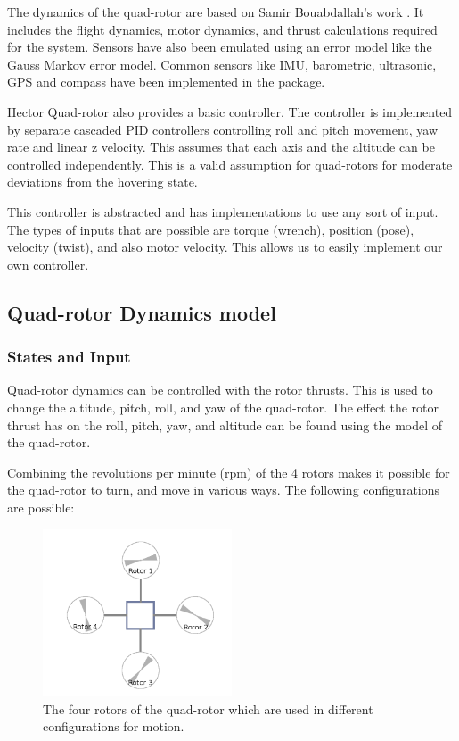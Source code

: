 \documentclass[hidelinks,BTech]{iitmdiss}
\begin{document}
The dynamics of the quad-rotor are based on Samir Bouabdallah's work \cite{QuadrotorDynamics}. It includes the flight dynamics, motor dynamics, and thrust calculations required for the system. Sensors have also been emulated using an error model like the Gauss Markov error model. Common sensors like IMU, barometric, ultrasonic, GPS and compass have been implemented in the package.

Hector Quad-rotor also provides a basic controller. The controller is implemented by separate cascaded PID controllers controlling roll and pitch movement, yaw rate and linear z velocity. This assumes that each axis and the altitude can be controlled independently. This is a valid assumption for quad-rotors for moderate deviations from the hovering state.

This controller is abstracted and has implementations to use any sort of input. The types of inputs that are possible are torque (wrench), position (pose), velocity (twist), and also motor velocity. This allows us to easily implement our own controller.

\subsection{Quad-rotor Dynamics model}

\subsubsection{States and Input}
Quad-rotor dynamics can be controlled with the rotor thrusts. This is used to change the altitude, pitch, roll, and yaw of the quad-rotor. The effect the rotor thrust has on the roll, pitch, yaw, and altitude can be found using the model of the quad-rotor.

Combining the revolutions per minute (rpm) of the 4 rotors makes it possible for the quad-rotor to turn, and move in various ways. The following configurations are possible:

\begin{figure}[H]
  \centering
    \includegraphics[width=0.5\textwidth]{quadrotor_rotors_names.png}
    \caption{The four rotors of the quad-rotor which are used in different configurations for motion.}
\end{figure}
\end{document}
